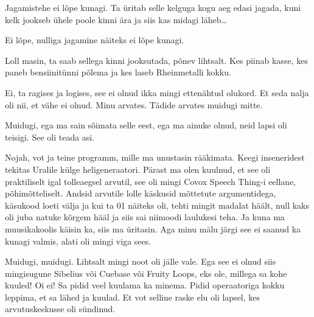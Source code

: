 Jagamistehe ei lõpe kunagi. Ta üritab selle kelguga kogu aeg edasi jagada, kuni kelk jookseb ühele poole kinni ära ja siis kas midagi läheb\ldots


Ei lõpe, nulliga jagamine näiteks ei lõpe kunagi. 


Loll masin, ta saab sellega kinni jooksutada, põnev lihtsalt. Kes piinab kasse, kes  paneb bensiinitünni põlema ja kes laseb Rheinmetalli kokku.


Ei, ta ragises ja logises, see ei olnud ikka mingi ettenähtud olukord. Et seda nalja oli nii, et vähe ei olnud. Minu arvates. Tädide arvates muidugi mitte. 


Muidugi, ega ma sain sõimata selle eest, ega ma ainuke olnud,  neid lapsi oli teisigi. See oli teada asi.

Nojah, vot ja teine programm, mille ma unustasin rääkimata. Keegi inseneridest tekitas Uralile  külge heligeneraatori. Pärast ma olen kuulnud, et see oli praktiliselt igal tolleaegsel arvutil, see oli mingi Covox Speech Thing-i eellane, põhimõtteliselt. Andsid arvutile lolle käskusid mõttetute argumentidega, käsukood loeti välja ja kui ta 01 näiteks oli, tehti mingit madalat häält, null kaks oli  juba natuke kõrgem hääl ja siis sai niimoodi laulukesi teha. Ja kuna ma muusikakoolis käisin ka, siis ma üritasin. Aga minu mälu järgi see ei saanud ka kunagi valmis, alati oli mingi viga sees. 


Muidugi, muidugi. Lihtsalt mingi noot oli jälle vale. Ega see ei olnud siis mingisugune Sibelius või Cuebase või Fruity Loops, eks ole, millega sa kohe kuuled! Oi ei! Sa pidid veel kuulama ka minema. Pidid operaatoriga kokku leppima, et sa lähed ja kuulad. Et vot selline raske elu oli lapsel, kes arvutuskeskusse oli sündinud. 


